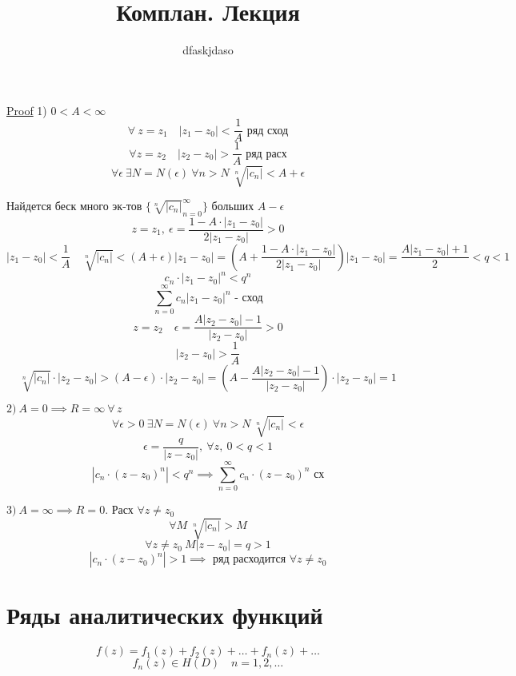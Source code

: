 \documentclass[a4paper]{article}
\begin{document}
\title{Комплан. Лекция}
\author{dfaskjdaso}
\maketitle

\begin{tcolorbox}
    \underline{Proof} 1) $0 < A < \infty$
    \[
        \forall \ z = z_1 \quad |z_1 - z_0 | < \frac{1}{A} \text{ ряд сход}
    \]
    \[
        \forall z = z_2 \quad |z_2 - z_0| > \frac{1}{A} \text{ ряд расх}
    \]
    \[
        \forall \epsilon \ \exists N = N(\epsilon) \ \forall n > N \ 
        \sqrt[n]{|c_n|} < A + \epsilon
    \]

    Найдется беск много эк-тов $ \{ \sqrt[n]{|c_n|}_{n=0}^{\infty}\} $ больших $ A - \epsilon $ 
    \[
        z = z_1, \ \epsilon = \frac{1 - A \cdot |z_1 - z_0|}{2 |z_1 - z_0|} > 0
    \]
    \[
        |z_1 - z_0| < \frac{1}{A} \quad \sqrt[n]{|c_n|} < (A + \epsilon)
        |z_1 - z_0| = \left(A +\frac{1 - A \cdot |z_1 - z_0|}{2 |z_1 - z_0|}\right)
        |z_1 - z_0| = \frac{A |z_1 - z_0| + 1}{2} < q < 1
    \]
    \[
        c_n \cdot |z_1 - z_0|^{n} < q^{n}
    \]
    \[
        \sum_{n=0}^{\infty} c_n |z_1 - z_0|^{n} \text{ - сход}
    \]
    \[
        z = z_2 \quad \epsilon = \frac{A |z_2 - z_0| - 1}{|z_2 - z_0|} > 0
    \]
    \[
        |z_2 - z_0| > \frac{1}{A} 
    \]
    \[
        \sqrt[n]{|c_n|} \cdot |z_2 - z_0| > (A - \epsilon) \cdot |z_2 - z_0| =
        \left( A - \frac{A|z_2 - z_0| - 1}{|z_2 - z_0|} \right) \cdot |z_2 - z_0|
        = 1
    \]

$ 2) \ A = 0 \implies R = \infty \ \forall \, z $ 
\[
    \forall \epsilon > 0 \ \exists N = N(\epsilon) \ \forall n > N \ 
    \sqrt[n]{|c_n|} < \epsilon
\]
\[
    \epsilon = \frac{q}{|z-z_0|}, \ \forall z, \ 0 < q < 1
\]
\[
    |c_n \cdot (z - z_0)^{n} | < q^{n} \implies \sum_{n=0}^{\infty} 
    c_n \cdot (z - z_0)^{n} \text{ сх}
\]

$ 3) \ A = \infty \implies R = 0 $. Расх $ \forall z \neq z_0 $  
\[
    \forall M\  \sqrt[n]{|c_n|} > M
\]
\[
    \forall z \neq z_0 \ M |z - z_0| = q > 1
\]
\[
    |c_n \cdot (z - z_0)^{n} | > 1 \implies \text{ ряд расходится } \forall z \neq z_0
\]
\end{tcolorbox}

\section*{\centering Ряды аналитических функций}
\begin{equation}
    f(z) = f_1(z) + f_2(z) + \dots + f_n(z) + \dots
\end{equation}
\[
    f_n(z) \in H(D) \quad n = 1, 2, \dots
\]
\end{document}
